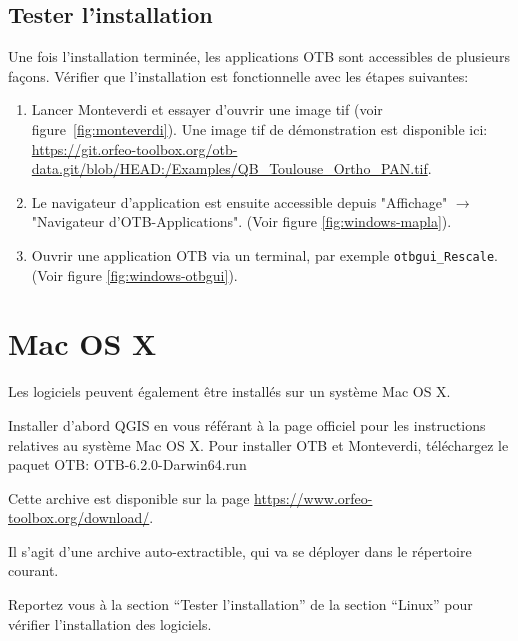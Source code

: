 \documentclass[10pt,a4paper]{article}
\begin{document}
\subsection{Tester l'installation}
Une fois l'installation terminée, les applications OTB sont accessibles de
plusieurs façons. Vérifier que l'installation est fonctionnelle avec les étapes
suivantes:
\begin{enumerate}

\item Lancer Monteverdi et essayer d'ouvrir une image tif (voir
figure~\ref{fig:monteverdi}). Une image tif de démonstration est disponible ici:
\url{https://git.orfeo-toolbox.org/otb-data.git/blob/HEAD:/Examples/QB\_Toulouse\_Ortho\_PAN.tif}.

\item Le navigateur d'application est ensuite accessible depuis "Affichage"
$\rightarrow$ "Navigateur d'OTB-Applications".
(Voir figure \ref{fig:windows-mapla}).

\item Ouvrir une application OTB via un terminal, par exemple
\texttt{otbgui\_Rescale}. (Voir figure \ref{fig:windows-otbgui}).

\end{enumerate}

\clearpage
\section{Mac OS X}

Les logiciels peuvent également être installés sur un système Mac OS X.

Installer d'abord QGIS en vous référant à la page officiel pour les instructions
relatives au système Mac OS X.
Pour installer OTB et Monteverdi, téléchargez le paquet OTB:
OTB-6.2.0-Darwin64.run

Cette archive est disponible sur la page \url{https://www.orfeo-toolbox.org/download/}.

Il s'agit d'une archive auto-extractible, qui va se déployer dans le répertoire
courant.

Reportez vous à la section ``Tester l'installation'' de la section ``Linux''
pour vérifier l'installation des logiciels.
\end{document}
